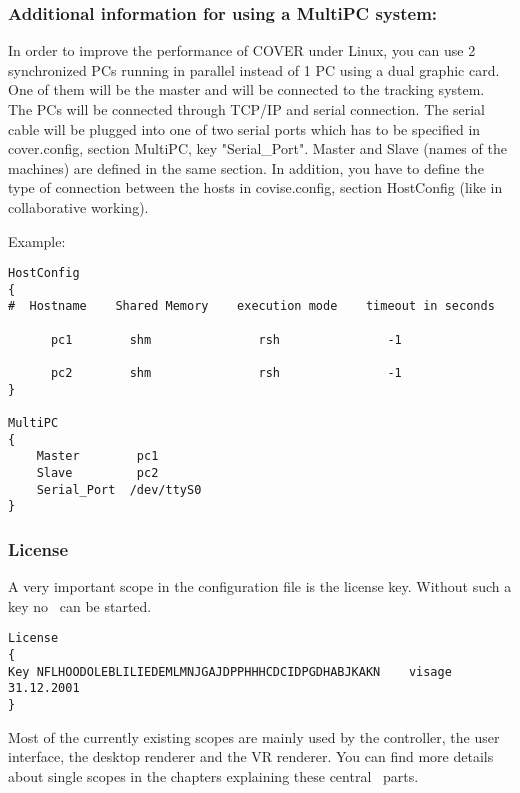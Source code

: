 \subsubsection {Additional information for using a MultiPC system:}

In order to improve the performance of COVER under Linux, you can use 2 synchronized PCs 
running in parallel instead of 1 PC using a dual graphic card. One of them will be the 
master and will be connected to the tracking system. The PCs will be connected through
TCP/IP and serial connection. The serial cable will be plugged into one
of two serial ports which has to be specified in cover.config, section MultiPC, 
key "Serial\_Port". Master and Slave (names of the machines) are defined in the same
section. In addition, you have to define the type of connection between the hosts in 
covise.config, section HostConfig (like in collaborative working).


Example:
\begin {verbatim}
HostConfig
{
#  Hostname    Shared Memory    execution mode    timeout in seconds

      pc1        shm               rsh               -1

      pc2        shm               rsh               -1
}

MultiPC
{
    Master        pc1
    Slave         pc2
    Serial_Port  /dev/ttyS0
}
\end{verbatim}

\subsubsection{License}
A very important scope in the configuration file is the license key. Without such a key no \covise\ 
can be started.

\begin{verbatim}
License
{
Key NFLHOODOLEBLILIEDEMLMNJGAJDPPHHHCDCIDPGDHABJKAKN    visage    31.12.2001 
}
\end{verbatim}


Most of the currently existing scopes are mainly used by the controller, the user interface, the
desktop renderer and the VR renderer. You can find more details about single scopes in the
chapters explaining these central \covise\ parts.



